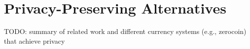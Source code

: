\section{Privacy-Preserving Alternatives}
TODO: summary of related work and different currency systems (e.g., zerocoin) that achieve privacy

